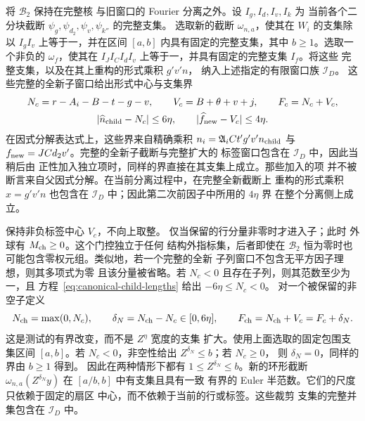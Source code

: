将 \(\mathcal B_2\) 保持在完整核
与旧窗口的 Fourier 分离之外。设 \(I_g,I_d,I_v,I_k\) 为
当前各个二分块截断 \(\psi_g,\psi_{d_2},\psi_v,\psi_{k''}\) 的完整支集。
选取新的截断 \(\omega_{n,a}\)，使其在
\(W_i\) 的支集除以 \(I_gI_v\) 上等于一，并在区间
\([a,b]\) 内具有固定的完整支集，其中 \(b\ge1\)。选取一个非负的 \(\omega_f\)，使其在
\(I_JI_CI_dI_v\) 上等于一，并具有固定的完整支集 \(I_f\)。将这些
完整支集，以及在其上重构的形式乘积 \(g'v'n\)，
纳入上述指定的有限窗口族 \(\mathcal I_D\)。
这些完整的全新子窗口给出形式中心与支集界
\begin{equation}\label{eq:canonical-child-lengths}
 \begin{gathered}
 N_c=r-A_i-B-t-g-v,\qquad V_c=B+\theta+v+j,\qquad F_c=N_c+V_c,\\
 |\widehat n_{\rm child}-N_c|\le6\eta,\qquad
 |\widehat f_{\rm new}-V_c|\le4\eta.
 \end{gathered}
\end{equation}
在因式分解表达式上，这些界来自精确乘积
\(n_i=\mathfrak A_iCt'g'v'n_{\rm child}\) 与
\(f_{\rm new}=JCd_2v'\)。完整的全新子截断与完整扩大的
标签窗口包含在 \(\mathcal I_D\) 中，因此当稍后由
正性加入独立项时，同样的界直接在其支集上成立。那些加入的项
并不被断言来自父因式分解。在当前分离过程中，在完整全新截断上
重构的形式乘积 \(x=g'v'n\) 也包含在
\(\mathcal I_D\) 中；因此第二次前因子中所用的 \(4\eta\) 界
在整个分离侧上成立。

保持非负标签中心 \(V_c\)，不向上取整。
仅当保留的行分量非零时才进入子；此时
外球有 \(M_{\rm ch}\ge0\)。这个门控独立于任何
结构外指标集，后者即使在
\(\mathcal B_2\) 恒为零时也可能包含零权元组。类似地，若一个完整的全新
子列窗口不包含无平方因子理想，则其多项式为零
且该分量被省略。若 \(N_c<0\) 且存在子列，则其范数至少为一，且
方程~\eqref{eq:canonical-child-lengths} 给出 \(-6\eta\le N_c<0\)。
对一个被保留的非空子定义
\begin{equation}\label{eq:inverse-child-clipping}
 N_{\rm ch}=\max(0,N_c),\qquad \delta_N=N_{\rm ch}-N_c\in[0,6\eta],
 \qquad F_{\rm ch}=N_{\rm ch}+V_c=F_c+\delta_N.
\end{equation}
这是测试的有界改变，而不是 \(Z^\eta\) 宽度的支集
扩大。使用上面选取的固定包围支集区间 \([a,b]\)。若
\(N_c<0\)，非空性给出 \(Z^{\delta_N}\le b\)；若 \(N_c\ge0\)，
则 \(\delta_N=0\)，同样的界由 \(b\ge1\) 得到。
因此在两种情形下都有 \(1\le Z^{\delta_N}\le b\)。新的环形截断
\(\omega_{n,a}(Z^{\delta_N}y)\) 在 \([a/b,b]\) 中有支集且具有一致
有界的 Euler 半范数。它们的尺度只依赖于固定的扇区
中心，而不依赖于当前的行或标签。这些裁剪
支集的完整并集包含在 \(\mathcal I_D\) 中。

